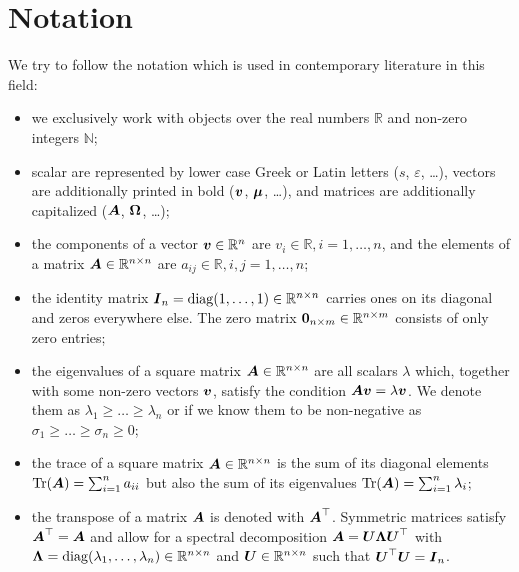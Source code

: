 \chapter*{Notation}
\label{chp:0-notation}

We try to follow the notation which is used in contemporary literature in this field:

\begin{itemize}
    \item we exclusively work with objects over the real numbers $\mathbb{R}$ and non-zero integers $\mathbb{N}$;
    \item scalar are represented by lower case Greek or Latin letters ($s$, $\varepsilon$, \dots),
          vectors are additionally printed in bold ($\boldsymbol{v}$, $\boldsymbol{\mu}$, \dots),
          and matrices are additionally capitalized ($\boldsymbol{A}$, $\boldsymbol{\Omega}$, \dots);
    \item the components of a vector $\boldsymbol{v} \in \mathbb{R}^{n}$ are $v_i \in \mathbb{R}, i = 1, \dots, n$,
          and the elements of a matrix $\boldsymbol{A} \in \mathbb{R}^{n \times n}$ are $a_{ij} \in \mathbb{R}, i, j = 1, \dots, n$;
    \item the identity matrix $\boldsymbol{I}_n = \operatorname{diag}(1, \dots, 1) \in \mathbb{R}^{n \times n}$
          carries ones on its diagonal and zeros everywhere else. The zero matrix
          $\boldsymbol{0}_{n \times m} \in \mathbb{R}^{n \times m}$ consists of only zero entries;
    \item the eigenvalues of a square matrix $\boldsymbol{A} \in \mathbb{R}^{n \times n}$
          are all scalars $\lambda$ which, together with some non-zero vectors
          $\boldsymbol{v}$, satisfy the condition $\boldsymbol{A} \boldsymbol{v} = \lambda \boldsymbol{v}$.
          We denote them as $\lambda_1 \geq \dots \geq \lambda_n$ or if we know
          them to be non-negative as $\sigma_1 \geq \dots \geq \sigma_n \geq 0$;
    \item the trace of a square matrix $\boldsymbol{A} \in \mathbb{R}^{n \times n}$ is
          the sum of its diagonal elements $\operatorname{Tr}(\boldsymbol{A}) = \sum_{i=1}^n a_{ii}$
          but also the sum of its eigenvalues $\operatorname{Tr}(\boldsymbol{A}) = \sum_{i=1}^n \lambda_i$;
    \item the transpose of a matrix $\boldsymbol{A}$ is denoted with $\boldsymbol{A}^{\top}$.
          Symmetric matrices satisfy $\boldsymbol{A}^{\top} = \boldsymbol{A}$ and
          allow for a spectral decomposition $\boldsymbol{A} = \boldsymbol{U} \boldsymbol{\Lambda} \boldsymbol{U}^{\top}$
          with $\boldsymbol{\Lambda} = \operatorname{diag}(\lambda_1, \dots, \lambda_n) \in \mathbb{R}^{n \times n}$ and 
          $\boldsymbol{U} \in \mathbb{R}^{n \times n}$ such that $\boldsymbol{U}^{\top} \boldsymbol{U} = \boldsymbol{I}_n$.

\end{itemize}
